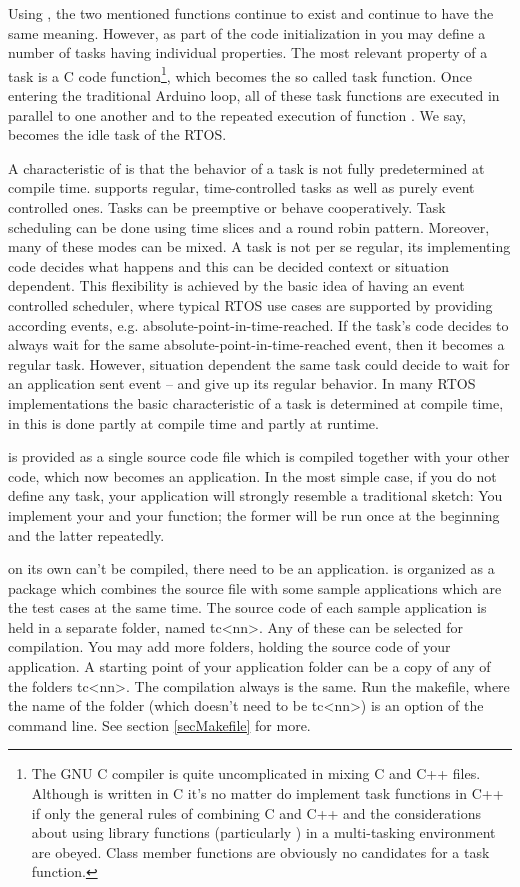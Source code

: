 Using \rtos{}, the two mentioned functions continue to exist and continue
to have the same meaning. However, as part of the code initialization in
 you may define a number of tasks having individual
properties. The most relevant property of a task is a C code
function\footnote{The GNU C compiler is quite uncomplicated in mixing C
and C++ files. Although \rtos{} is written in C it's no matter do
implement task functions in C++ if only the general rules of combining C
and C++ and the considerations about using library functions (particularly
) in a multi-tasking environment are obeyed. Class member
functions are obviously no candidates for a task function.}, which becomes
the so called task function. Once entering the traditional Arduino loop,
all of these task functions are executed in parallel to one another and to
the repeated execution of function . We say, 
becomes the idle task of the RTOS.

A characteristic of \rtos{} is that the behavior of a task is not fully
predetermined at compile time. \rtos{} supports regular, time-controlled
tasks as well as purely event controlled ones. Tasks can be preemptive or
behave cooperatively. Task scheduling can be done using time slices and a
round robin pattern. Moreover, many of these modes can be mixed. A task is
not per se regular, its implementing code decides what happens and this
can be decided context or situation dependent. This flexibility is
achieved by the basic idea of having an event controlled scheduler, where
typical RTOS use cases are supported by providing according events, e.g.
absolute-point-in-time-reached. If the task's code decides to always wait
for the same absolute-point-in-time-reached event, then it becomes a
regular task. However, situation dependent the same task could decide to
wait for an application sent event -- and give up its regular behavior. In
many RTOS implementations the basic characteristic of a task is determined
at compile time, in \rtos{} this is done partly at compile time and partly
at runtime.

\rtos{} is provided as a single source code file which is compiled together
with your other code, which now becomes an \rtos{} application. In the most
simple case, if you do not define any task, your application will strongly
resemble a traditional sketch: You implement your  and your
 function; the former will be run once at the beginning and
the latter repeatedly.

\rtos{} on its own can't be compiled, there need to be an application.
\rtos{} is organized as a package which combines the \rtos{} source file
with some sample applications which are the test cases at the same time.
The source code of each sample application is held in a separate folder,
named tc\textless nn\textgreater. Any of these can be selected for
compilation. You may add more folders, holding the source code of your
\rtos{} application. A starting point of your application folder can be a
copy of any of the folders tc\textless nn\textgreater. The compilation
always is the same. Run the makefile, where the name of the folder (which
doesn't need to be tc\textless nn\textgreater) is an option of the
command line. See section \ref{secMakefile} for more.

